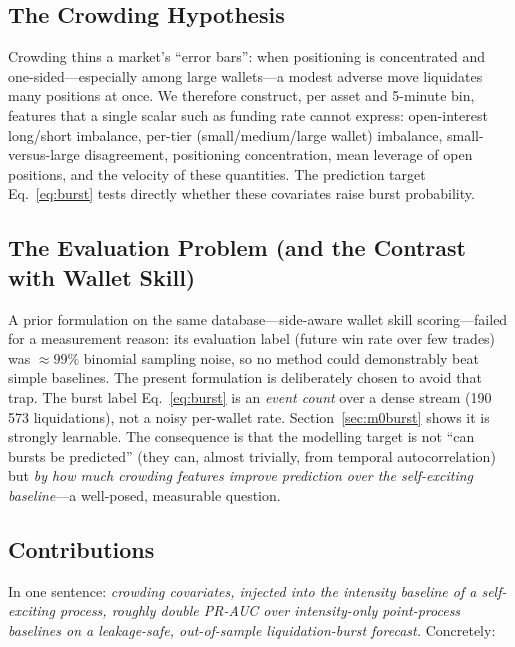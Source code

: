 \documentclass[11pt,a4paper]{article}
\begin{document}
\subsection{The Crowding Hypothesis}

Crowding thins a market's ``error bars'': when positioning is concentrated and one-sided---especially among large wallets---a modest adverse move liquidates many positions at once. We therefore construct, per asset and 5-minute bin, features that a single scalar such as funding rate cannot express: open-interest long/short imbalance, per-tier (small/medium/large wallet) imbalance, small-versus-large disagreement, positioning concentration, mean leverage of open positions, and the velocity of these quantities. The prediction target Eq.~\eqref{eq:burst} tests directly whether these covariates raise burst probability.

\subsection{The Evaluation Problem (and the Contrast with Wallet Skill)}

A prior formulation on the same database---side-aware wallet skill scoring---failed for a measurement reason: its evaluation label (future win rate over few trades) was $\approx99\%$ binomial sampling noise, so no method could demonstrably beat simple baselines. The present formulation is deliberately chosen to avoid that trap. The burst label Eq.~\eqref{eq:burst} is an \emph{event count} over a dense stream (190\,573 liquidations), not a noisy per-wallet rate. Section~\ref{sec:m0burst} shows it is strongly learnable. The consequence is that the modelling target is not ``can bursts be predicted'' (they can, almost trivially, from temporal autocorrelation) but \emph{by how much crowding features improve prediction over the self-exciting baseline}---a well-posed, measurable question.

\subsection{Contributions}

In one sentence: \emph{crowding covariates, injected into the intensity baseline of a self-exciting process, roughly double PR-AUC over intensity-only point-process baselines on a leakage-safe, out-of-sample liquidation-burst forecast.} Concretely:
\end{document}

